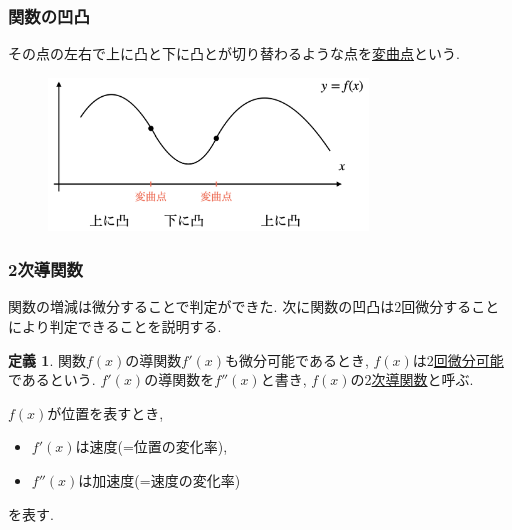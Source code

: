 \documentclass[dvipdfmx,cjk,10.2pt]{beamer}
\theoremstyle{definition}
\newtheorem{Def}[Thm]{定義}
\begin{document}



\begin{frame}
\frametitle{関数の凹凸}


その点の左右で上に凸と下に凸とが切り替わるような点を\underline{変曲点}という.


 \begin{figure}[htbp]
 \begin{center} 
  \includegraphics[width=85mm]{inflection.png}
 \end{center}
\end{figure}


\end{frame}





\begin{frame}
\frametitle{2次導関数}


関数の増減は微分することで判定ができた. 
次に関数の凹凸は$2$回微分することにより判定できることを説明する. 

\begin{Def}
関数$f(x)$の導関数$f'(x)$も微分可能であるとき, $f(x)$は\underline{$2$回微分可能}であるという. 
$f'(x)$の導関数を$f''(x)$と書き, $f(x)$の\underline{$2$次導関数}と呼ぶ. 
\end{Def}

$f(x)$が位置を表すとき, 
\begin{itemize}
\item $f'(x)$は速度(=位置の変化率), 
\item $f''(x)$は加速度(=速度の変化率) 
\end{itemize}
を表す.
\end{frame}


\end{document}
